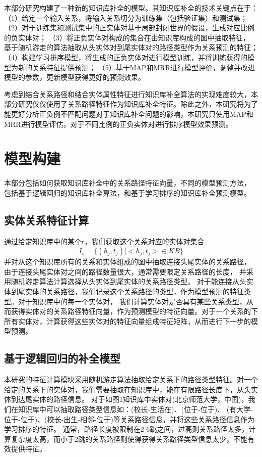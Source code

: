 本部分研究构建了一种新的知识库补全的模型。其知识库补全的技术关键点在于：
（1）给定一个输入关系，将输入关系切分为训练集（包括验证集）和测试集；
（2）对于训练集和测试集中的正实体对基于局部封闭世界的假设，生成对应比例的负实体对；
（3）将正负实体对构成的集合在由知识库构成的图中抽取特征，
基于随机游走的算法抽取从头实体对到尾实体对的路径类型作为关系预测的特征；
（4）构建学习排序模型，将生成的正负实体对进行模型训练，并将训练获得的模型为新的关系特征提供预测；
（5）基于MAP和MRR进行模型评价，调整并改进模型的参数，更新模型获得更好的预测效果。

考虑到结合关系路径和结合实体属性特征进行知识库补全算法的实现难度较大，本部分研究仅仅使用了关系路径特征作为知识库补全特征。除此之外，本研究将为了能更好分析正负例不匹配问题对于知识库补全问题的影响，本研究只使用MAP和MRR进行模型评估，对于不同比例的正负实体对进行排序模型效果预测。

\section{模型构建}
本部分包括如何获取知识库补全中的关系路径特征向量，不同的模型预测方法，
包括基于逻辑回归的知识库补全算法，和基于学习排序的知识库补全预测模型。

\subsection{实体关系特征计算}
通过给定知识库中的某个r，我们获取这个关系对应的实体对集合
$$I_s=\{(h_j,t_j)|<h_j,t_j> \in KB\}$$
并对从这个知识库所有的关系和实体组成的图中抽取连接头尾实体的关系路径，
由于连接头尾实体对之间的路径数量很大，通常需要限定关系路径的长度，
并采用随机游走算法计算选择从头实体到尾实体的关系路径类型。
对于能连接从头实体到尾实体的关系路径，我们记录这个关系路径的类型，作为模型预测的特征类型。对于知识库中的每一个实体对，
我们计算实体对是否具有某些关系类型，从而获得实体对的关系路径特征向量，作为预测模型的特征向量。对于一个关系的下所有实体对，计算获得这些实体对的特征向量组成特征矩阵，从而进行下一步的模型预测。

\subsection{基于逻辑回归的补全模型}

本研究的特征计算模块采用随机游走算法抽取给定关系下的路径类型特征。对一个给定的关系下的实体对，我们需要抽取在知识库中，能在有限路径长度下，从头实体到达尾实体的路径信息。
对于如图1知识库中实体对(北京师范大学，中国)，我们在知识库中可以抽取路径类型信息如：(校长-生活在)、(位于-位于)、
(有大学-位于-位于)、(校长-出生-相邻-位于)等关系路径信息，并将这些关系路径信息作为学习排序的特征。
通常，路径长度被限制在2-6跳之间，过高则关系路径太多，计算复杂度太高，而小于2跳的关系路径则使得获得关系路径类型信息太少，不能有效提供特征。

